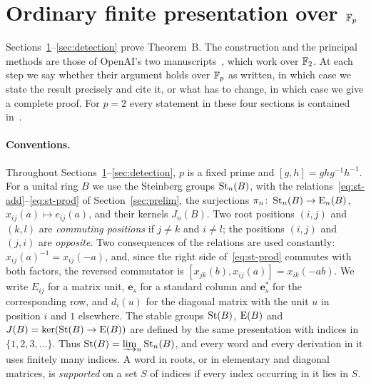
\newcommand{\grpMat}{\operatorname{Mat}}
\newcommand{\grpdiag}{\operatorname{diag}}
\newcommand{\grpord}{\operatorname{ord}}
\newcommand{\grpsgn}{\operatorname{sgn}}
\newcommand{\grpbe}{\mathbf e}

\section{Ordinary finite presentation over \texorpdfstring{$\mathbb F_p$}{F\_p}}\label{sec:fp}

Sections~\ref{sec:fp}--\ref{sec:detection} prove Theorem~B. The construction and the principal methods are those of
OpenAI's two manuscripts~\cite{OAI247periodic,OAI247rf}, which work over $\mathbb F_2$. At each step we say whether their
argument holds over $\mathbb F_p$ as written, in which case we state the result precisely and cite it, or what has to change, in
which case we give a complete proof. For $p=2$ every statement in these four sections is contained
in~\cite{OAI247periodic,OAI247rf}.

\paragraph{Conventions.}
Throughout Sections~\ref{sec:fp}--\ref{sec:detection}, $p$ is a fixed prime and $[g,h]=ghg^{-1}h^{-1}$. For a unital
ring $B$ we use the Steinberg groups $\operatorname{St}_n(B)$, with the relations~\eqref{eq:st-add}--\eqref{eq:st-prod} of
Section~\ref{sec:prelim}, the surjections $\pi_n\colon\operatorname{St}_n(B)\to\operatorname{E}_n(B)$, $x_{ij}(a)\mapsto e_{ij}(a)$, and their kernels
$J_n(B)$. Two root positions $(i,j)$ and $(k,l)$ are \emph{commuting positions} if $j\neq k$ and $i\neq l$; the
positions $(i,j)$ and $(j,i)$ are \emph{opposite}. Two consequences of the relations are used constantly:
$x_{ij}(a)^{-1}=x_{ij}(-a)$, and, since the right side of~\eqref{eq:st-prod} commutes with both factors, the reversed
commutator is $[x_{jk}(b),x_{ij}(a)]=x_{ik}(-ab)$. We write $E_{ij}$ for a matrix unit, $\grpbe_s$ for a standard column
and $\grpbe_s^*$ for the corresponding row, and $d_i(u)$ for the diagonal matrix with the unit $u$ in position $i$ and
$1$ elsewhere. The stable groups $\operatorname{St}(B)$, $\operatorname{E}(B)$ and $J(B)=\ker(\operatorname{St}(B)\to\operatorname{E}(B))$ are defined by the same presentation
with indices in $\{1,2,3,\dots\}$. Thus $\operatorname{St}(B)=\varinjlim_n\operatorname{St}_n(B)$, and every word and every derivation in it uses
finitely many indices. A word in roots, or in elementary and diagonal matrices, is \emph{supported} on a set $S$ of
indices if every index occurring in it lies in $S$.

